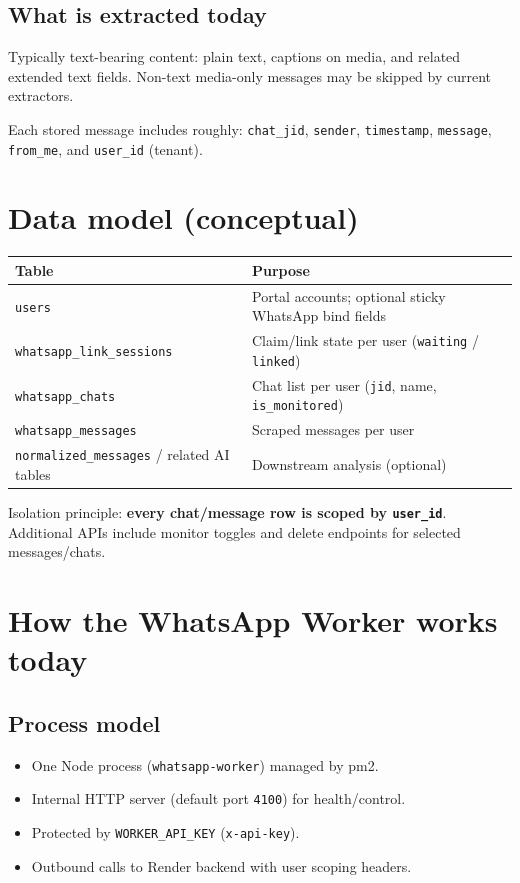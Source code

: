 \documentclass[11pt,a4paper]{article}
\begin{document}
\subsection{What is extracted today}

Typically text-bearing content: plain text, captions on media, and related extended text fields. Non-text media-only messages may be skipped by current extractors.

Each stored message includes roughly: \texttt{chat\_jid}, \texttt{sender}, \texttt{timestamp}, \texttt{message}, \texttt{from\_me}, and \texttt{user\_id} (tenant).

\section{Data model (conceptual)}

\begin{tabularx}{\textwidth}{L{5.6cm} X}
\toprule
\textbf{Table} & \textbf{Purpose} \\
\midrule
\texttt{users} & Portal accounts; optional sticky WhatsApp bind fields \\
\texttt{whatsapp\_link\_sessions} & Claim/link state per user (\texttt{waiting} / \texttt{linked}) \\
\texttt{whatsapp\_chats} & Chat list per user (\texttt{jid}, name, \texttt{is\_monitored}) \\
\texttt{whatsapp\_messages} & Scraped messages per user \\
\texttt{normalized\_messages} / related AI tables & Downstream analysis (optional) \\
\bottomrule
\end{tabularx}

\vspace{8pt}
Isolation principle: \textbf{every chat/message row is scoped by \texttt{user\_id}}. Additional APIs include monitor toggles and delete endpoints for selected messages/chats.

\section{How the WhatsApp Worker works today}

\subsection{Process model}

\begin{itemize}[leftmargin=1.2em]
  \item One Node process (\texttt{whatsapp-worker}) managed by pm2.
  \item Internal HTTP server (default port \texttt{4100}) for health/control.
  \item Protected by \texttt{WORKER\_API\_KEY} (\texttt{x-api-key}).
  \item Outbound calls to Render backend with user scoping headers.
\end{itemize}
\end{document}
